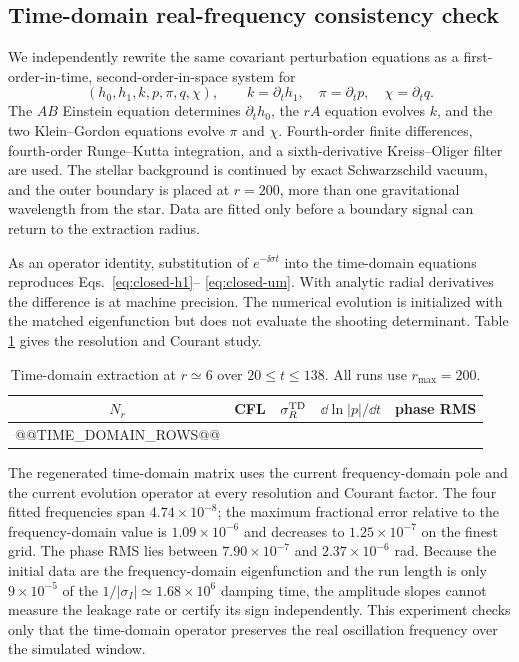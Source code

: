 \subsection{Time-domain real-frequency consistency check}

We independently rewrite the same covariant perturbation equations as a
first-order-in-time, second-order-in-space system for
\begin{equation}
(h_0,h_1,k,p,\pi,q,\chi),\qquad
k=\partial_t h_1,\quad \pi=\partial_t p,\quad \chi=\partial_t q.
\end{equation}
The $AB$ Einstein equation determines $\partial_t h_0$, the $rA$ equation
evolves $k$, and the two Klein--Gordon equations evolve $\pi$ and $\chi$.
Fourth-order finite differences, fourth-order Runge--Kutta integration, and a
sixth-derivative Kreiss--Oliger filter are used.  The stellar background is
continued by exact Schwarzschild vacuum, and the outer boundary is placed at
$r=200$, more than one gravitational wavelength from the star.  Data are
fitted only before a boundary signal can return to the extraction radius.

As an operator identity, substitution of $e^{-\ii\sigma t}$ into the
time-domain equations reproduces Eqs.~\eqref{eq:closed-h1}--
\eqref{eq:closed-um}.  With analytic radial derivatives the difference is at
machine precision.  The numerical evolution is initialized with the matched
eigenfunction but does not evaluate the shooting determinant.  Table
\ref{tab:axial-time-domain} gives the resolution and Courant study.
\begin{table}[!htbp]
\centering
\caption{Time-domain extraction at $r\simeq6$ over
$20\leq t\leq138$.  All runs use $r_{\max}=200$.}
\label{tab:axial-time-domain}
\small
\begin{tabular}{@{}ccccc@{}}
\toprule
$N_r$ & CFL & $\sigma_R^{\rm TD}$ & $\dd\ln|p|/\dd t$ & phase RMS \\
\midrule
@@TIME_DOMAIN_ROWS@@
\bottomrule
\end{tabular}
\end{table}
The regenerated time-domain matrix uses the current frequency-domain pole and
the current evolution operator at every resolution and Courant factor. The
four fitted frequencies span $4.74\times10^{-8}$; the maximum fractional error
relative to the frequency-domain value is $1.09\times10^{-6}$ and decreases to
$1.25\times10^{-7}$ on the finest grid. The phase RMS lies between
$7.90\times10^{-7}$ and $2.37\times10^{-6}$ rad. Because the initial data
are the frequency-domain eigenfunction and the run length is only
$9\times10^{-5}$ of the $1/|\sigma_I|\simeq1.68\times10^6$ damping time, the
amplitude slopes cannot measure the leakage rate or certify its sign
independently.  This experiment checks only that the time-domain operator
preserves the real oscillation frequency over the simulated window.
